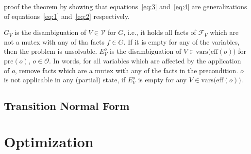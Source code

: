\citeauthor{fivser2020strengthening} proof the theorem by showing that equations~\eqref{eq:3} and~\eqref{eq:4} are generalizations of equations~\eqref{eq:1} and~\eqref{eq:2} respectively.

$G_V$ is the disambiguation of $V\in\mathcal{V}$ for $G$, i.e., it holds all facts of $\mathcal{F}_V$ which are not a mutex with any of tha facts $f\in G$.
If it is empty for any of the variables, then the problem is unsolvable.
$E^o_V$ is the disambiguation of $V\in\text{vars(eff}(o))$ for $\text{pre}(o)$, $o\in\mathcal{O}$.
In words, for all variables which are affected by the application of $o$, remove facts which are a mutex with any of the facts in the precondition.
$o$ is not applicable in any (partial) state, if $E^o_V$ is empty for any  $V\in\text{vars(eff}(o))$.



\subsection{Transition Normal Form}\label{subsec:transition-normal-form}



\begin{comment}
    \begin{definition}
        Let $f$ be a solution to the following LP:
        Maximize $\mathrm{opt}$ subject to $\sum_{V\in\mathcal{V}}\mathtt{P}_{\langle V, s[V]\rangle}\leq0$ and
        $\sum_{V\in\mathrm{vars(eff}(o))}(\mathtt{P}_{\langle V, \mathrm{pre}(o)[V]\rangle}-\mathtt{P}_{\langle V, \mathrm{eff}(o)[V]\rangle})\leq\mathrm{c}(o)$
        for all $o\in\mathcal{O}$, where the objective function $\athrm{opt}$ can be chosen arbitrarily.
        Then the function $\mathrm{pot}_{\mathrm{opt}}(\langle V,v\rangle)=f()$
    \end{definition}
\end{comment}


\section{Optimization}\label{sec:optimization}


